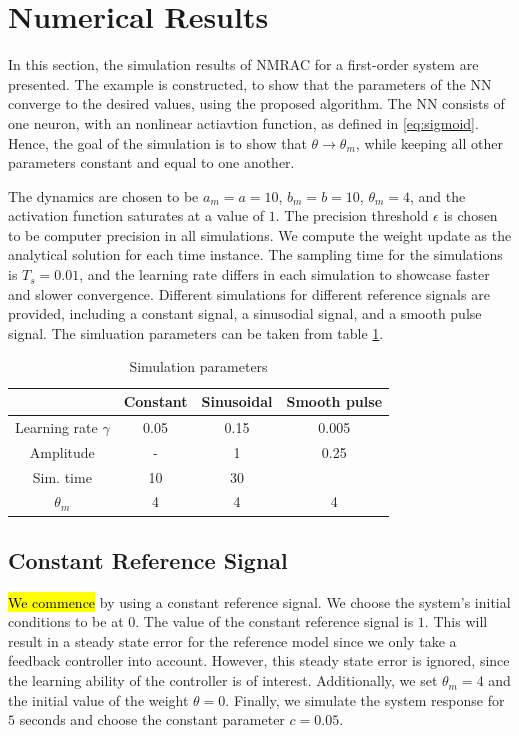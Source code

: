 \section{Numerical Results}

In this section, the simulation results of NMRAC for a first-order system are presented. The example is constructed, to show that the parameters of the NN converge to the desired values, using the proposed algorithm. The NN consists of one neuron, with an nonlinear actiavtion function, as defined in \eqref{eq:sigmoid}. Hence, the goal of the simulation is to show that $\theta\rightarrow\theta_m$, while keeping all other parameters constant and equal to one another.

The dynamics are chosen to be $a_m=a=10$, $b_m=b=10$, $\theta_m=4$, and the activation function saturates at a value of $1$. The precision threshold $\epsilon$ is chosen to be computer precision in all simulations. We compute the weight update as the analytical solution for each time instance. The sampling time for the simulations is $T_s=0.01$, and the learning rate differs in each simulation to showcase faster and slower convergence. Different simulations for different reference signals are provided, including a constant signal, a sinusodial signal, and a smooth pulse signal. The simluation parameters can be taken from table \ref{tab:sim-settings}.

\begin{table}
    \centering
    \caption{Simulation parameters}\label{tab:sim-settings}
    \begin{tabular}{ c c c c } 
            \hline
            & Constant  & Sinusoidal  & Smooth pulse \\
            \hline 
            Learning rate $\gamma$ & 0.05 & 0.15 & 0.005\\ 
            Amplitude & - & 1 & 0.25 \\
            Sim. time & 10 & 30 & \\
            $\theta_m$ & 4 & 4 & 4 \\
            \hline
        \end{tabular}
\end{table}

\subsection{Constant Reference Signal}


\hl{We commence} by using a constant reference signal. We choose the system's initial conditions to be at $0$. The value of the constant reference signal is $1$. This will result in a steady state error for the reference model since we only take a feedback controller into account. However, this steady state error is ignored, since the learning ability of the controller is of interest. Additionally, we set $\theta_m=4$ and the initial value of the weight $\theta=0$. Finally, we simulate the system response for $5$ seconds and choose the constant parameter $c=0.05$.

